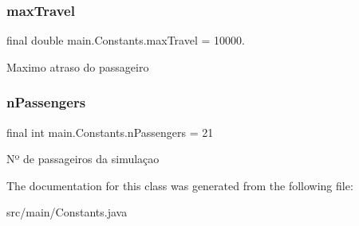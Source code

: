 \subsubsection{\texorpdfstring{max\+Travel}{maxTravel}}
{\footnotesize\ttfamily final double main.\+Constants.\+max\+Travel = 10000.\hspace{0.3cm}{\ttfamily [static]}}

Maximo atraso do passageiro \mbox{\label{classmain_1_1_constants_a4f0981009a65cde20f0cd7a0bd1f026c}} 
\subsubsection{\texorpdfstring{n\+Passengers}{nPassengers}}
{\footnotesize\ttfamily final int main.\+Constants.\+n\+Passengers = 21\hspace{0.3cm}{\ttfamily [static]}}

Nº de passageiros da simulaçao 

The documentation for this class was generated from the following file\+:\begin{DoxyCompactItemize}
\item 
src/main/Constants.\+java\end{DoxyCompactItemize}
